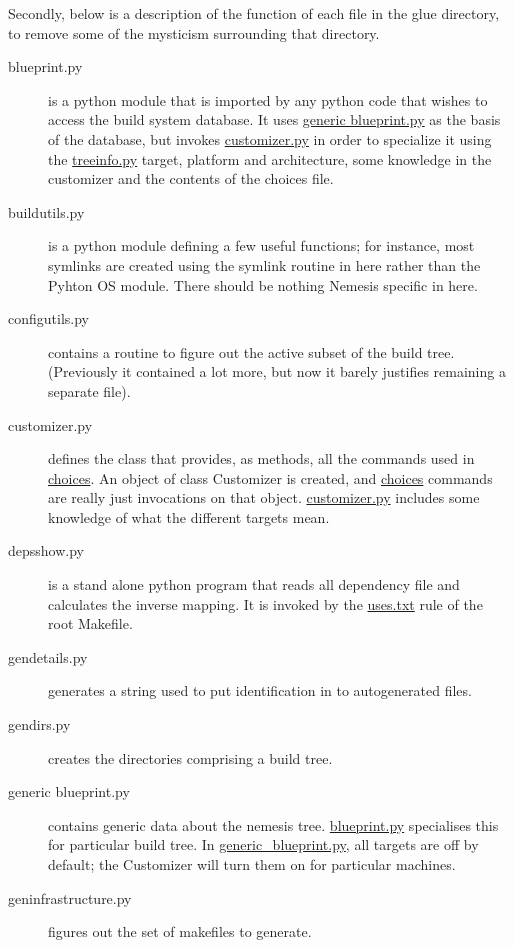 \documentclass[a4paper]{article}
\begin{document}
Secondly, below is a description of the function of each file in the
glue directory, to remove some of the mysticism surrounding that
directory.

\begin{description}
\item[blueprint.py] is a python module that is imported by any python
code that wishes to access the build system database. It uses
\url{generic blueprint.py} as the basis of the database, but invokes
\url{customizer.py} in order to specialize it using the
\url{treeinfo.py} target, platform and architecture, some knowledge in
the customizer and the contents of the choices file.

\item[buildutils.py] is a python module defining a few useful
functions; for instance, most symlinks are created using the symlink
routine in here rather than the Pyhton OS module. There should be
nothing Nemesis specific in here.

\item[configutils.py] contains a routine to figure out the active
subset of the build tree. (Previously it contained a lot more, but now
it barely justifies remaining a separate file).

\item[customizer.py] defines the class that provides, as methods, all
the commands used in \url{choices}. An object of class Customizer is
created, and \url{choices} commands are really just invocations on
that object. \url{customizer.py} includes some knowledge of what the
different targets mean.

\item[depsshow.py] is a stand alone python program that reads all
dependency file and calculates the inverse mapping. It is invoked by
the \url{uses.txt} rule of the root Makefile.

\item[gendetails.py] generates a string used to put identification in
to autogenerated files.

\item[gendirs.py] creates the directories comprising a build tree.

\item[generic blueprint.py] contains generic data about the nemesis
tree. \url{blueprint.py} specialises this for particular build
tree. In \url{generic_blueprint.py}, all targets are off by default;
the Customizer will turn them on for particular machines.

\item[geninfrastructure.py] figures out the set of makefiles to
generate.


\end{description}
\end{document}

